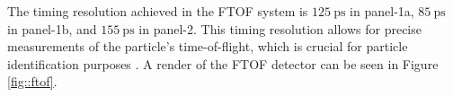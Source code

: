     The timing resolution achieved in the FTOF system is $125 ~\text{ps}$ in panel-1a, $85 ~\text{ps}$ in panel-1b, and $155 ~\text{ps}$ in panel-2.
    This timing resolution allows for precise measurements of the particle's time-of-flight, which is crucial for particle identification purposes \cite{carman2020ftof}.
    A render of the FTOF detector can be seen in Figure \ref{fig::ftof}.
